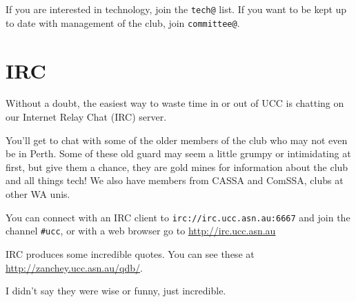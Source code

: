 If you are interested in technology, join the \texttt{tech@} list. If you want to be kept up to date with management of the club, join \texttt{committee@}.



\section{IRC}

Without a doubt, the easiest way to waste time in or out of UCC 
is chatting on our Internet Relay Chat (IRC) server. 

You'll get to chat with some of the older members of the club who 
may not even be in Perth. Some of these old guard may seem a 
little grumpy or intimidating at first, but give them a chance, they 
are gold mines for information about the club and all things tech! 
We also have members from CASSA and ComSSA, clubs at other WA unis. 

You can connect with an IRC client to \texttt{irc://irc.ucc.asn.au:6667} 
and join the channel \texttt{\#ucc}, or with a web browser go to 
\url{http://irc.ucc.asn.au}


IRC produces some incredible quotes. You can see these at \url{http://zanchey.ucc.asn.au/qdb/}.

I didn't say they were wise or funny, just incredible.


